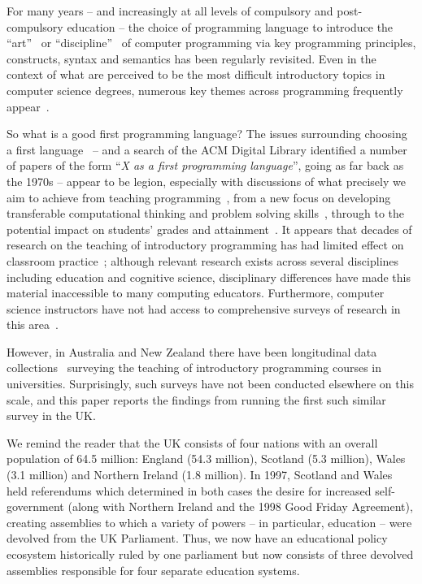 \documentclass[english,submission]{programming}
\begin{document}
For many years -- and increasingly at all levels of compulsory and
post-compulsory education -- the choice of programming language to
introduce the ``art''~\cite{knuth:2011} or
``discipline''~\cite{dijkstra:1976} of computer programming via key
programming principles, constructs, syntax and semantics has been
regularly revisited. Even in the context of what are perceived to be
the most difficult introductory topics in computer science degrees,
numerous key themes across programming frequently
appear~\cite{dale:2006}.

So what is a good first programming language? The issues surrounding
choosing a first language~\cite{gupta:2004,kaplan:2010} -- and a
search of the ACM Digital Library identified a number of papers of the
form ``{\emph{X as a first programming language}}'', going as far back
as the 1970s -- appear to be legion, especially with discussions of
what precisely we aim to achieve from teaching
programming~\cite{fincher:1999,schult+bennedsen:2006}, from a new
focus on developing transferable computational thinking and problem
solving skills~\cite{wing:2008}, through to the potential impact on
students' grades and
attainment~\cite{simon-et-al:2006,bergin+reilly:2006,porter-et-al:2013,ivanovic-et-al:2015}. It
appears that decades of research on the teaching of introductory
programming has had limited effect on classroom
practice~\cite{pears-et-al:2007}; although relevant research exists
across several disciplines including education and cognitive science,
disciplinary differences have made this material inaccessible to many
computing educators. Furthermore, computer science instructors have
not had access to comprehensive surveys of research in this
area~\cite{mccracken-et-al:2001,pears-et-al:2007}.

However, in Australia and New Zealand there have been longitudinal
data
collections~\cite{deraadt-et-al:2004,mason-et-al:2012,mason+cooper:2014}
surveying the teaching of introductory programming courses in
universities. Surprisingly, such surveys have not been conducted
elsewhere on this scale, and this paper reports the findings from
running the first such similar survey in the UK.

We remind the reader that the UK consists of four nations with an
overall population of 64.5 million: England (54.3 million), Scotland
(5.3 million), Wales (3.1 million) and Northern Ireland (1.8
million). In 1997, Scotland and Wales held referendums which
determined in both cases the desire for increased self-government
(along with Northern Ireland and the 1998 Good Friday Agreement),
creating assemblies to which a variety of powers -- in particular,
education -- were devolved from the UK Parliament. Thus, we now have
an educational policy ecosystem historically ruled by one parliament
but now consists of three devolved assemblies responsible for four
separate education systems.
\end{document}
